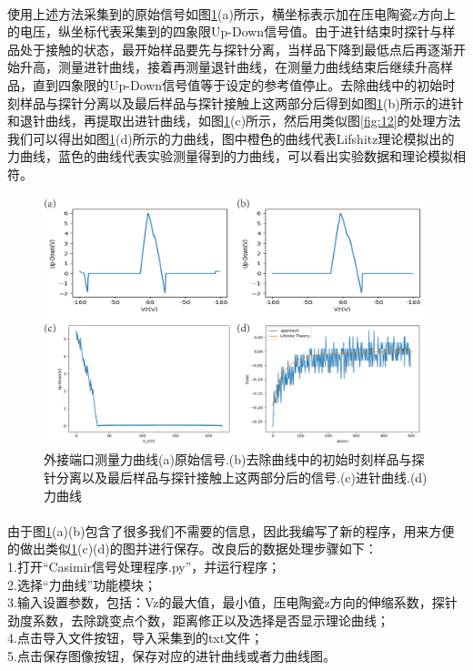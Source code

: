 \paragraph*{}
使用上述方法采集到的原始信号如图\ref{fig:13}(a)所示，横坐标表示加在压电陶瓷z方向上的电压，纵坐标代表采集到的四象限Up-Down信号值。由于进针结束时探针与样品处于接触的状态，最开始样品要先与探针分离，当样品下降到最低点后再逐渐开始升高，测量进针曲线，接着再测量退针曲线，在测量力曲线结束后继续升高样品，直到四象限的Up-Down信号值等于设定的参考值停止。去除曲线中的初始时刻样品与探针分离以及最后样品与探针接触上这两部分后得到如图\ref{fig:13}(b)所示的进针和退针曲线，再提取出进针曲线，如图\ref{fig:13}(c)所示，然后用类似图\ref{fig:12}的处理方法我们可以得出如图\ref{fig:13}(d)所示的力曲线，图中橙色的曲线代表Lifshitz理论模拟出的力曲线，蓝色的曲线代表实验测量得到的力曲线，可以看出实验数据和理论模拟相符。
\begin{figure}[h]
	\centering
	\includegraphics[scale=0.3]{figures/自测力曲线}
	\caption{外接端口测量力曲线(a)原始信号.(b)去除曲线中的初始时刻样品与探针分离以及最后样品与探针接触上这两部分后的信号.(c)进针曲线.(d)力曲线}
	\label{fig:13}
\end{figure}
\paragraph*{}
由于图\ref{fig:13}(a)(b)包含了很多我们不需要的信息，因此我编写了新的程序，用来方便的做出类似\ref{fig:13}(c)(d)的图并进行保存。改良后的数据处理步骤如下：
\\1.打开“Casimir信号处理程序.py”，并运行程序；
\\2.选择“力曲线”功能模块；
\\3.输入设置参数，包括：Vz的最大值，最小值，压电陶瓷z方向的伸缩系数，探针劲度系数，去除跳变点个数，距离修正以及选择是否显示理论曲线；
\\4.点击导入文件按钮，导入采集到的txt文件；
\\5.点击保存图像按钮，保存对应的进针曲线或者力曲线图。
